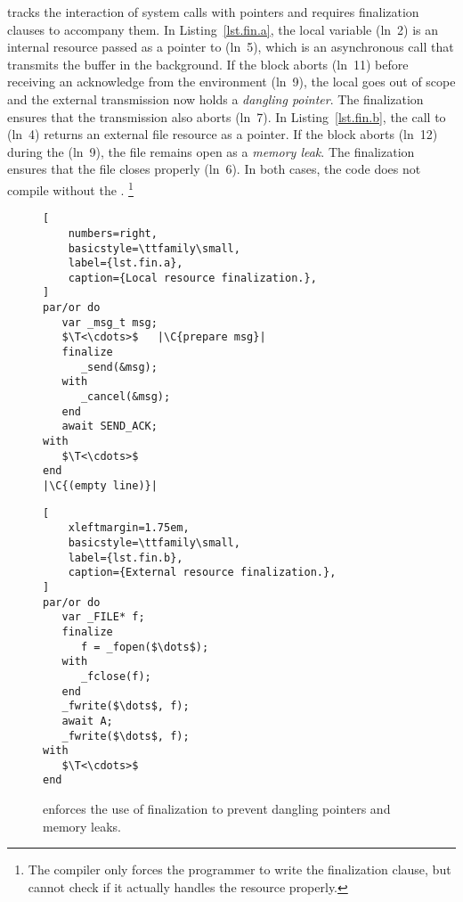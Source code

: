 \CEU tracks the interaction of system calls with pointers and requires
finalization clauses to accompany them.
%
In Listing~\ref{lst.fin.a}, the local variable 
(ln~2) is an internal resource passed as a pointer to  (ln~5),
which is an asynchronous call that transmits the buffer in the background.
If the block aborts (ln~11) before receiving an acknowledge from the
environment (ln~9), the local  goes out of scope and the external
transmission now holds a \emph{dangling pointer}.
The finalization ensures that the transmission also aborts (ln~7).
%
In Listing~\ref{lst.fin.b}, the call to  (ln~4) returns an
external file resource as a pointer.
If the block aborts (ln~12) during the  (ln~9), the file
remains open as a \emph{memory leak}.
The finalization ensures that the file closes properly (ln~6).
%
In both cases, the code does not compile without the .%
\footnote{%
The compiler only forces the programmer to write the finalization clause, but
cannot check if it actually handles the resource properly.}

\begin{figure}[b!]
\begin{minipage}[t]{0.45\linewidth}
\begin{lstlisting}[
    numbers=right,
    basicstyle=\ttfamily\small,
    label={lst.fin.a},
    caption={Local resource finalization.},
]
par/or do
   var _msg_t msg;
   $\T<\cdots>$   |\C{prepare msg}|
   finalize
      _send(&msg);
   with
      _cancel(&msg);
   end
   await SEND_ACK;
with
   $\T<\cdots>$
end
|\C{(empty line)}|
\end{lstlisting}
\end{minipage}%
%
\begin{minipage}[t]{0.53\linewidth}
\begin{lstlisting}[
    xleftmargin=1.75em,
    basicstyle=\ttfamily\small,
    label={lst.fin.b},
    caption={External resource finalization.},
]
par/or do
   var _FILE* f;
   finalize
      f = _fopen($\dots$);
   with
      _fclose(f);
   end
   _fwrite($\dots$, f);
   await A;
   _fwrite($\dots$, f);
with
   $\T<\cdots>$
end
\end{lstlisting}
\end{minipage}%
\caption{%
\CEU enforces the use of finalization to prevent dangling pointers and memory leaks.}
\label{lst.fin}
\end{figure}

